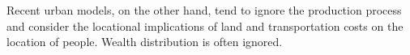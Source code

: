 




Recent urban models, on the other hand, tend to ignore the production process and consider the locational implications of land and transportation costs on the location of people. Wealth distribution is often ignored. 


